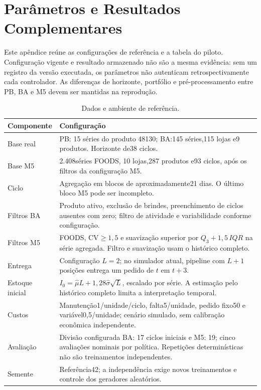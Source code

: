 \appendix
\chapter{Parâmetros e Resultados Complementares}
\label{app:reproducibility}
\renewcommand{\thetable}{A.\arabic{table}}
\setcounter{table}{0}

Este apêndice reúne as configurações de referência e a tabela do piloto. Configuração vigente e resultado armazenado não são a mesma evidência: sem um registro da versão executada, os parâmetros não autenticam retrospectivamente cada controlador. As diferenças de horizonte, portfólio e pré-processamento entre PB, BA e M5 devem ser mantidas na reprodução.

\begin{table}[htbp]\centering\small
\caption{Dados e ambiente de referência.}\label{tab:global_params}
\begin{tabular}{@{}p{3cm}p{11.4cm}@{}}\toprule
\textbf{Componente} & \textbf{Configuração}\\\midrule
Base real & PB: 15 séries do produto 48130; BA:145 séries,115 lojas e9 produtos. Horizonte de38 ciclos.\\
Base M5 & 2.408séries FOODS, 10 lojas,287 produtos e93 ciclos, após os filtros da configuração M5.\\
Ciclo & Agregação em blocos de aproximadamente21 dias. O último bloco M5 pode ser incompleto.\\
Filtros BA & Produto ativo, exclusão de brindes, preenchimento de ciclos ausentes com zero; filtro de atividade e variabilidade conforme configuração.\\
Filtros M5 & FOODS, CV$\geq1,5$ e suavização superior por $Q_3+1,5\,IQR$ na série agregada. Filtro e suavização usam o histórico completo.\\
Entrega & Configuração $L=2$; no simulador atual, pipeline com $L+1$ posições entrega um pedido de $t$ em $t+3$.\\
Estoque inicial & $I_0=\hat\mu L+1,28\hat\sigma\sqrt L$, escalado por série. A estimação pelo histórico completo limita a interpretação temporal.\\
Custos & Manutenção1/unidade/ciclo, falta5/unidade, pedido fixo50 e variável0,5/unidade; cenário simulado, sem calibração econômica independente.\\
Avaliação & Divisão configurada BA: 17 ciclos iniciais e M5: 19; cinco avaliações nominais por política. Repetições determinísticas não são treinamentos independentes.\\
Semente & Referência42; a independência exige novos treinamentos e controle dos geradores aleatórios.\\
\bottomrule\end{tabular}\end{table}


